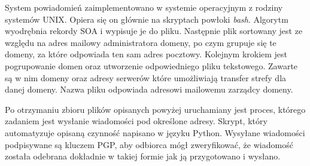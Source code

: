 System powiadomień zaimplementowano w systemie operacyjnym z rodziny systemów UNIX. Opiera się on głównie na skryptach powłoki
\textit{bash}. Algorytm wyodrębnia rekordy SOA i wypisuje je do pliku. Następnie plik sortowany jest ze względu na adres mailowy
administratora domeny, po czym grupuje się te domeny, za które odpowiada ten sam adres pocztowy. Kolejnym krokiem jest pogrupowanie
domen oraz utworzenie odpowiedniego pliku tekstowego. Zawarte są w nim domeny oraz adresy serwerów które umożliwiają transfer
strefy dla danej domeny. Nazwa pliku odpowiada adresowi mailowemu zarządcy domeny.

Po otrzymaniu zbioru plików opisanych powyżej uruchamiany jest proces, którego zadaniem jest wysłanie wiadomości pod określone
adresy. Skrypt, który automatyzuje opisaną czynność napisano w języku Python\cite{python}. Wysyłane wiadomości podpisywane są
kluczem PGP\cite{}, aby odbiorca mógł zweryfikować, że wiadomość została odebrana dokładnie w takiej formie jak ją przygotowano
i wysłano.
